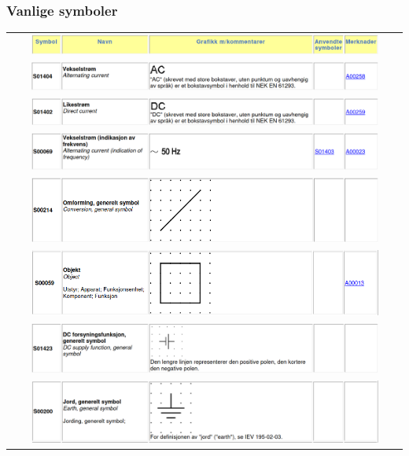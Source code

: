 \documentclass{article}
\begin{document}
\subsubsection*{Vanlige symboler}
\begin{center}
    \begin{longtable}{c}
    \includegraphics[width=0.9\textwidth]{bilder/header.png}\\
    \includegraphics[width=0.9\textwidth]{bilder/s01404.png}\\
    \includegraphics[width=0.9\textwidth]{bilder/s01402.png}\\
    \includegraphics[width=0.9\textwidth]{bilder/s00069.png}\\
    \includegraphics[width=0.9\textwidth]{bilder/s00214.png}\\
    \includegraphics[width=0.9\textwidth]{bilder/s00059.png}\\
    \includegraphics[width=0.9\textwidth]{bilder/s01423.png}\\
    \includegraphics[width=0.9\textwidth]{bilder/s00200.png}\\

\end{longtable}
\end{center}
\end{document}
